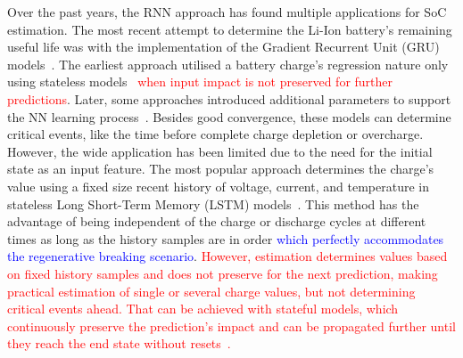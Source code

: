 % 
%
Over the past years, the RNN approach has found multiple applications for SoC estimation.
The most recent attempt to determine the Li-Ion battery's remaining useful life was with the implementation of the Gradient Recurrent Unit (GRU) models~\cite{song_lithium-ion_2018,javid_adaptive_2020,xiao_accurate_2019,jiao_gru-rnn_2020}.
The earliest approach utilised a battery charge's regression nature only using stateless models~\cite{song_lithium-ion_2018,jiao_gru-rnn_2020,xiao_accurate_2019} \textcolor{red}{when input impact is not preserved for further predictions}.
Later, some approaches introduced additional parameters to support the NN learning process~\cite{mamo_long_2020,jiao_gru-rnn_2020,javid_adaptive_2020}.
Besides good convergence, these models can determine critical events, like the time before complete charge depletion or overcharge.
However, the wide application has been limited due to the need for the initial state as an input feature.
The most popular approach determines the charge's value using a fixed size recent history of voltage, current, and temperature in stateless Long Short-Term Memory (LSTM) models~\cite{Chemali2017,mamo_long_2020,javid_adaptive_2020,zhang_deep_2020}.
This method has the advantage of being independent of the charge or discharge cycles at different times as long as the history samples are in order \textcolor{blue}{which perfectly accommodates the regenerative breaking scenario}.
\textcolor{red}{However, estimation determines values based on fixed history samples and does not preserve for the next prediction, making practical estimation of single or several charge values, but not determining critical events ahead.
That can be achieved with stateful models, which continuously preserve the prediction's impact and can be propagated further until they reach the end state without resets~\cite{zhu_statefulnes_tfdocs_2020}.}

